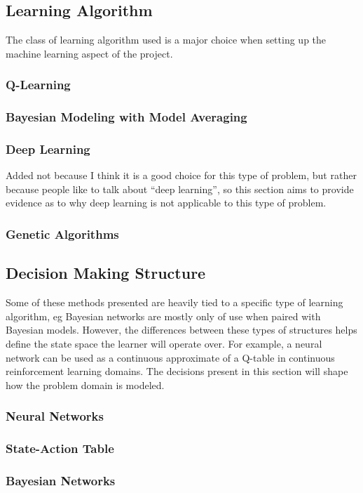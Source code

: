 \documentclass[draftclsnofoot,onecolumn,letterpaper,10pt]{IEEEtran}
\begin{document}
\subsection{Learning Algorithm}
The class of learning algorithm used is a major choice when setting up the machine learning aspect of the project.

\subsubsection{Q-Learning}
\subsubsection{Bayesian Modeling with Model Averaging}
\subsubsection{Deep Learning}
Added not because I think it is a good choice for this type of problem, but rather because people like to talk about ``deep learning'', so this section aims to provide evidence as to why deep learning is not applicable to this type of problem.
\subsubsection{Genetic Algorithms}


\subsection{Decision Making Structure}
Some of these methods presented are heavily tied to a specific type of learning algorithm, eg Bayesian networks are mostly only of use when paired with Bayesian models.
However, the differences between these types of structures helps define the state space the learner will operate over.
For example, a neural network can be used as a continuous approximate of a Q-table in continuous reinforcement learning domains.
The decisions present in this section will shape how the problem domain is modeled.
\subsubsection{Neural Networks}
\subsubsection{State-Action Table}
\subsubsection{Bayesian Networks}
\end{document}

